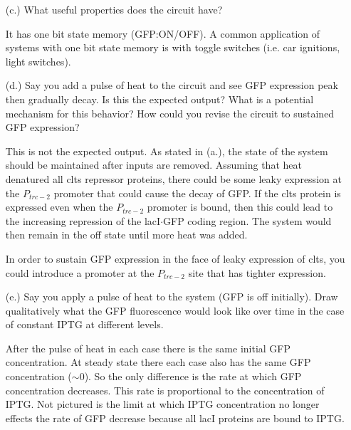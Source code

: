 \documentclass[11pt]{article}
\begin{document}
\begin{itemize}
\item[(c.)]What useful properties does the circuit have?

It has one bit state memory (GFP:ON/OFF). A common application of systems with one bit state memory is with toggle switches (i.e. car ignitions, light switches).

\item[(d.)]Say you add a pulse of heat to the circuit and see GFP expression peak then gradually decay. Is this the expected output? What is a potential mechanism for this behavior? How could you revise the circuit to sustained GFP expression?

This is not the expected output. As stated in (a.), the state of the system should be maintained after inputs are removed. Assuming that heat denatured all clts repressor proteins, there could be some leaky expression at the $P_{trc-2}$ promoter that could cause the decay of GFP. If the clts protein is expressed even when the $P_{trc-2}$ promoter is bound, then this could lead to the increasing repression of the lacI$\cdot $GFP coding region. The system would then remain in the off state until more heat was added. 

In order to sustain GFP expression in the face of leaky expression of clts, you could introduce a promoter at the $P_{trc-2}$ site that has tighter expression.

\item[(e.)]Say you apply a pulse of heat to the system (GFP is off initially). Draw qualitatively what the GFP fluorescence would look like over time in the case of constant IPTG at different levels.
\newline
{}

After the pulse of heat in each case there is the same initial GFP concentration. At steady state there each case also has the same GFP concentration ($\sim 0$). So the only difference is the rate at which GFP concentration decreases. This rate is proportional to the concentration of IPTG. Not pictured is the limit at which IPTG concentration no longer effects the rate of GFP decrease because all lacI proteins are bound to IPTG.

\end{itemize}
\end{document}
